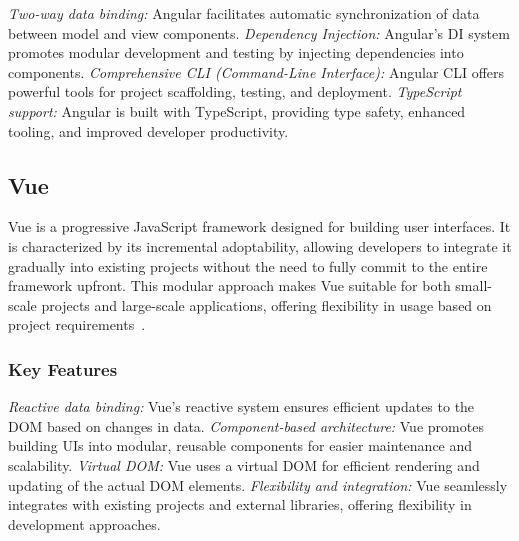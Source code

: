 \textit{Two-way data binding:} Angular facilitates automatic synchronization of data between model and view components.
\newline\textit{Dependency Injection:} Angular's DI system promotes modular development and testing by injecting dependencies into components.
\newline\textit{Comprehensive CLI (Command-Line Interface):} Angular CLI offers powerful tools for project scaffolding, testing, and deployment.
\newline\textit{TypeScript support:} Angular is built with TypeScript, providing type safety, enhanced tooling, and improved developer productivity.

\subsection{Vue}

Vue is a progressive JavaScript framework designed for building user interfaces. It is characterized by its incremental adoptability, allowing developers to integrate it gradually into existing projects without the need to fully commit to the entire framework upfront. This modular approach makes Vue suitable for both small-scale projects and large-scale applications, offering flexibility in usage based on project requirements~\cite{vuejs2024}.

\subsubsection{Key Features}

\textit{Reactive data binding:} Vue's reactive system ensures efficient updates to the DOM based on changes in data.
\newline\textit{Component-based architecture:} Vue promotes building UIs into modular, reusable components for easier maintenance and scalability.
\newline\textit{Virtual DOM:} Vue uses a virtual DOM for efficient rendering and updating of the actual DOM elements.
\newline\textit{Flexibility and integration:} Vue seamlessly integrates with existing projects and external libraries, offering flexibility in development approaches.


